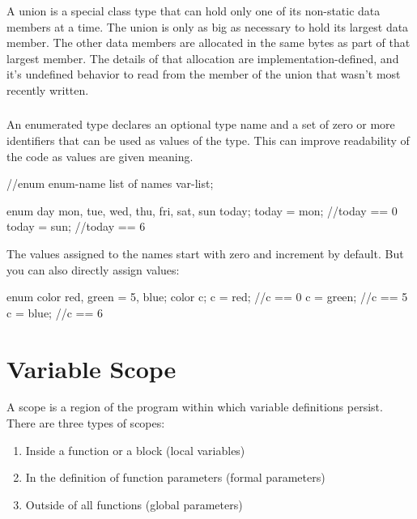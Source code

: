 \documentclass[10pt,a4paper]{scrartcl}
\begin{document}
\begin{multicols*}{2}
\subsubsection{}

A union is a special class type that can hold only one of its non-static data members at a time. The union is only as big as necessary to hold its largest data member. The other data members are allocated in the same bytes as part of that largest member. The details of that allocation are implementation-defined, and it's undefined behavior to read from the member of the union that wasn't most recently written.

\subsubsection{}

An enumerated type declares an optional type name and a set of zero or more identifiers that can be used as values of the type. This can improve readability of the code as values are given meaning.

\begin{TPCpp}
//enum enum-name {list of names} var-list;

enum day {mon, tue, wed, thu, fri, sat, sun} today;
today = mon; //today == 0
today = sun; //today == 6
\end{TPCpp}

The values assigned to the names start with zero and increment by default. But you can also directly assign values:

\begin{TPCpp}
enum color {red, green = 5, blue};
color c;
c = red;    //c == 0
c = green;  //c == 5
c = blue;   //c == 6
\end{TPCpp}

\section{Variable Scope}

A scope is a region of the program within which variable definitions persist. There are three types of scopes:

\begin{enumerate}
\item Inside a function or a block (local variables)
\item In the definition of function parameters (formal parameters)
\item Outside of all functions (global parameters)
\end{enumerate}


\end{multicols*}
\end{document}
